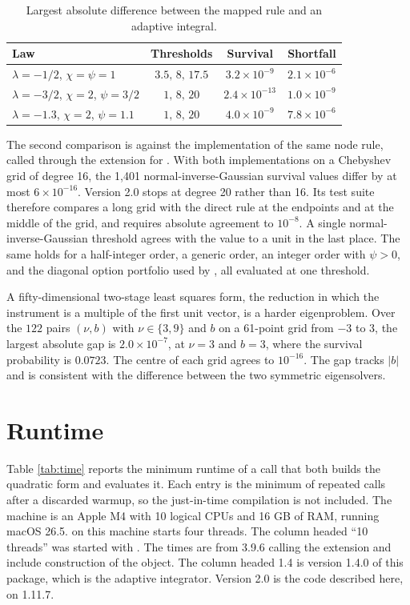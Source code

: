\documentclass[article]{jss}
\begin{document}
\begin{table}[ht]
\centering
\begin{tabular}{lccc}
\toprule
Law & Thresholds & Survival & Shortfall \\
\midrule
$\lambda=-1/2$, $\chi=\psi=1$ & $3.5,\,8,\,17.5$ & $3.2\times 10^{-9}$ & $2.1\times 10^{-6}$ \\
$\lambda=-3/2$, $\chi=2$, $\psi=3/2$ & $1,\,8,\,20$ & $2.4\times 10^{-13}$ & $1.0\times 10^{-9}$ \\
$\lambda=-1.3$, $\chi=2$, $\psi=1.1$ & $1,\,8,\,20$ & $4.0\times 10^{-9}$ & $7.8\times 10^{-6}$ \\
\bottomrule
\end{tabular}
\caption{Largest absolute difference between the mapped rule and an adaptive integral.}
\label{tab:gk}
\end{table}

The second comparison is against the  implementation of the same node rule, called through the  extension for .
With both implementations on a Chebyshev grid of degree 16, the 1{,}401 normal-inverse-Gaussian survival values differ by at most $6\times 10^{-16}$.
Version 2.0 stops at degree 20 rather than 16.
Its test suite therefore compares a long grid with the direct rule at the endpoints and at the middle of the grid, and requires absolute agreement to $10^{-8}$.
A single normal-inverse-Gaussian threshold agrees with the  value to a unit in the last place.
The same holds for a half-integer order, a generic order, an integer order with $\psi>0$, and the diagonal option portfolio used by \citet{bz:21}, all evaluated at one threshold.

A fifty-dimensional two-stage least squares form, the reduction in which the instrument is a multiple of the first unit vector, is a harder eigenproblem.
Over the $122$ pairs $(\nu,b)$ with $\nu\in\{3,9\}$ and $b$ on a 61-point grid from $-3$ to $3$, the largest absolute gap is $2.0\times 10^{-7}$, at $\nu=3$ and $b=3$, where the survival probability is $0.0723$.
The centre of each grid agrees to $10^{-16}$.
The gap tracks $|b|$ and is consistent with the difference between the two symmetric eigensolvers.

\section{Runtime} \label{sec:time}

Table \ref{tab:time} reports the minimum runtime of a call that both builds the quadratic form and evaluates it.
Each entry is the minimum of repeated calls after a discarded warmup, so the just-in-time compilation is not included.
The machine is an Apple M4 with 10 logical CPUs and 16 GB of RAM, running macOS 26.5.
 on this machine starts four  threads.
The column headed ``10 threads'' was started with .
The  times are from  3.9.6 calling the extension and include construction of the  object.
The  column headed 1.4 is version 1.4.0 of this package, which is the adaptive integrator.
Version 2.0 is the code described here, on  1.11.7.
\end{document}
